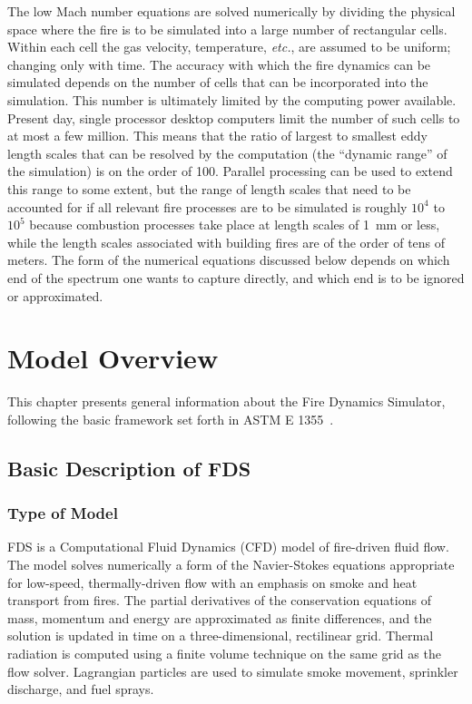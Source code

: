 \documentclass[11pt]{book}
\begin{document}
The low Mach number equations are solved numerically by dividing the physical space where
the fire is to be simulated into a large number of rectangular cells. Within each cell the gas
velocity, temperature, {\em etc.}, are assumed to be uniform; changing only with time.
The accuracy with which the fire dynamics can be simulated depends on the number of cells
that can be incorporated into the simulation. This number is ultimately limited
by the computing power available. Present day, single processor desktop computers limit the number of
such cells to at most a few million. This means that the ratio of largest to smallest eddy length
scales that can be resolved by the computation (the ``dynamic range'' of the simulation) is on the order of 100.
Parallel processing can be used to extend this range to some extent, but
the range of length scales that need to be accounted for if all relevant
fire processes are to be simulated is roughly $10^4$ to $10^5$ because combustion processes take place at
length scales of 1~mm or less, while the length scales associated with building fires are of the order of
tens of meters. The form of the numerical equations discussed below depends on which end of the
spectrum one wants to capture directly, and which end is to be ignored or approximated.





\chapter{Model Overview}

This chapter presents general information about the Fire Dynamics Simulator, following the basic framework set forth in
ASTM E 1355~\cite{ASTM:E1355}.

\section{Basic Description of FDS}


\subsection{Type of Model}

FDS is a Computational Fluid Dynamics (CFD) model of fire-driven fluid flow.
The model solves numerically a form of the Navier-Stokes equations appropriate
for low-speed, thermally-driven flow with an emphasis on smoke and heat transport
from fires. The partial derivatives of the conservation equations of mass, momentum and energy are approximated
as finite differences, and the solution is updated in time on a three-dimensional, rectilinear grid.
Thermal radiation is computed using a finite volume technique on the same grid as the flow solver.
Lagrangian particles are used to simulate smoke movement, sprinkler discharge, and fuel sprays.
\end{document}
